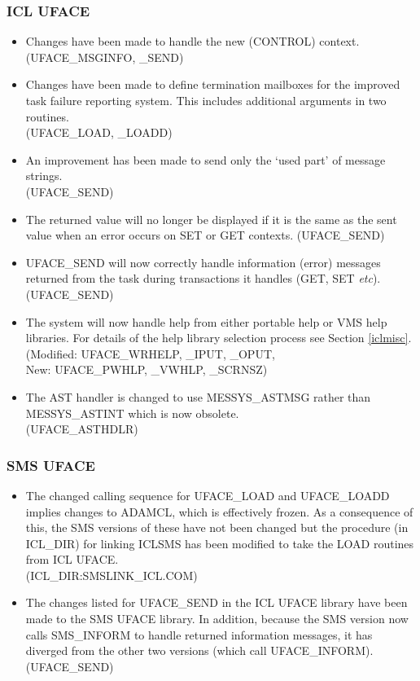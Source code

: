 \subsubsection{ICL UFACE}
\label{uface}
\begin{itemize}
\item Changes have been made to handle the new (CONTROL) context.\\
(UFACE\_MSGINFO, \_SEND)
\item Changes have been made to define termination mailboxes for the improved
task failure reporting system. This includes additional arguments in two
routines.\\
(UFACE\_LOAD, \_LOADD)
\item An improvement has been made to send only the `used part' of message
strings.\\
(UFACE\_SEND)
\item The returned value will no longer be displayed if it is the same as
the sent value when an error occurs on SET or GET contexts.
(UFACE\_SEND)
\item UFACE\_SEND will now correctly handle information (error) messages
returned from the task during transactions it handles (GET, SET {\em etc}).\\
(UFACE\_SEND)
\item The system will now handle help from either portable help or VMS help
libraries. For details of the help library selection process see Section
\ref{iclmisc}.\\
(Modified: UFACE\_WRHELP, \_IPUT, \_OPUT,\\
New: UFACE\_PWHLP, \_VWHLP, \_SCRNSZ)
\item The AST handler is changed to use MESSYS\_ASTMSG rather than
MESSYS\_ASTINT which is now obsolete.\\
(UFACE\_ASTHDLR)
\end{itemize}
\subsubsection{SMS UFACE}
\begin{itemize}
\item The changed calling sequence for UFACE\_LOAD and UFACE\_LOADD implies
changes to ADAMCL, which is effectively frozen.
As a consequence of this, the SMS versions of these have not been changed but
the procedure (in ICL\_DIR) for linking
ICLSMS has been modified to take the LOAD routines from ICL UFACE.\\
(ICL\_DIR:SMSLINK\_ICL.COM)
\item The changes listed for UFACE\_SEND in the ICL UFACE library have been
made to the SMS UFACE library. In addition, because the SMS version now
calls SMS\_INFORM to handle returned information messages, it has diverged from
the other two versions (which call UFACE\_INFORM).\\
(UFACE\_SEND)
\end{itemize}

